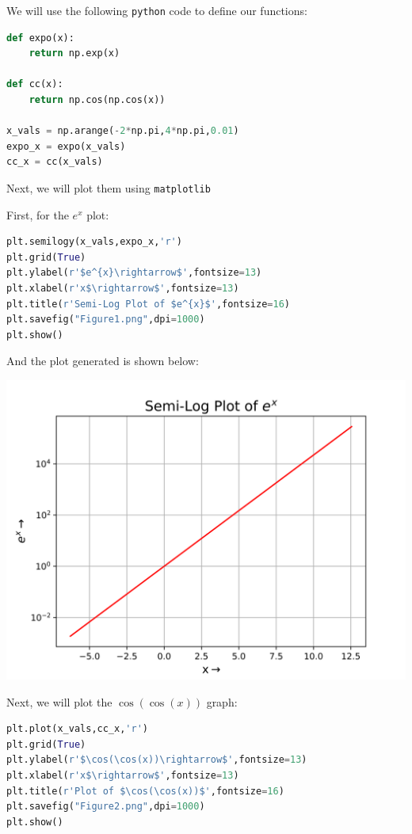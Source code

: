 \documentclass[12pt]{article}
\begin{document}
\bigskip
We will use the following \texttt{python} code to define our functions:
\bigskip

\begin{lstlisting}[language=Python]
def expo(x):
    return np.exp(x)

def cc(x):
    return np.cos(np.cos(x))
    
x_vals = np.arange(-2*np.pi,4*np.pi,0.01)
expo_x = expo(x_vals)
cc_x = cc(x_vals)
\end{lstlisting}

\pagebreak
Next, we will plot them using \texttt{matplotlib}

First, for the $e^x$ plot:

\bigskip
\begin{lstlisting}[language=Python]
plt.semilogy(x_vals,expo_x,'r')
plt.grid(True)
plt.ylabel(r'$e^{x}\rightarrow$',fontsize=13)
plt.xlabel(r'x$\rightarrow$',fontsize=13)
plt.title(r'Semi-Log Plot of $e^{x}$',fontsize=16)
plt.savefig("Figure1.png",dpi=1000)
plt.show()
\end{lstlisting}

And the plot generated is shown below:

\begin{center}
    \includegraphics[scale=0.8]{images/Figure1.png}
\end{center}

\bigskip

\pagebreak
Next, we will plot the $\cos(\cos(x))$ graph:
\bigskip
\begin{lstlisting}[language=Python]
plt.plot(x_vals,cc_x,'r')
plt.grid(True)
plt.ylabel(r'$\cos(\cos(x))\rightarrow$',fontsize=13)
plt.xlabel(r'x$\rightarrow$',fontsize=13)
plt.title(r'Plot of $\cos(\cos(x))$',fontsize=16)
plt.savefig("Figure2.png",dpi=1000)
plt.show()
\end{lstlisting}
\end{document}
